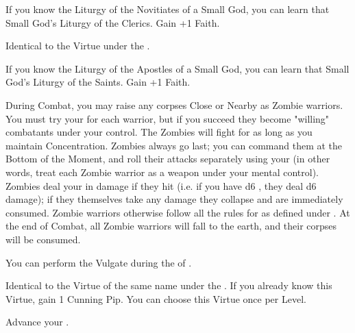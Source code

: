 \begin{multicols*}{2}
If you know the Liturgy of the Novitiates of a Small God, you can learn that Small God's Liturgy of the Clerics. Gain +1 \MAX Faith.


Identical to the  Virtue under the .


If you know the Liturgy of the Apostles of a Small God, you can learn that Small God's Liturgy of the Saints. Gain +1 \MAX Faith.

\newpage


During Combat, you may raise any corpses Close or Nearby as Zombie warriors. You must try your \JUJU for each warrior, but if you succeed they become "willing" combatants under your control. The Zombies will fight for as long as you maintain Concentration. Zombies always go last; you can command them at the Bottom of the Moment, and roll their attacks separately using your \FOC (in other words, treat each Zombie warrior as a \FOC weapon under your mental control). Zombies deal your \JUJU in damage if they hit (i.e. if you have d6 \JUJU, they deal d6 damage); if they themselves take any damage they collapse and are immediately consumed. Zombie warriors otherwise follow all the rules for  as defined under .  At the end of Combat, all Zombie warriors will fall to the earth, and their corpses will be consumed. 


You can perform the  Vulgate during the  of . 



Identical to the Virtue of the same name under the . If you already know this Virtue, gain 1 Cunning Pip. You can choose this Virtue once per Level.



Advance your  \DCUP.  



\end{multicols*}
